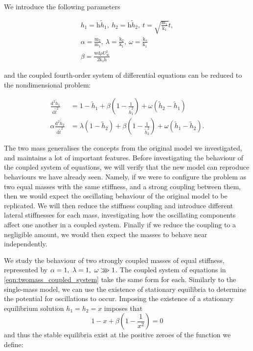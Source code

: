 \documentclass{article}
\begin{document}
We introduce the following parameters

\begin{equation*}
    \begin{aligned}
        h_1 = \mathrm{h}\tilde{h}_1,~h_2 = \mathrm{h}\tilde{h}_2,~t=\sqrt{\frac{\mathrm{m}_1}{\mathrm{k}_1}}\tilde{t}, \\
        \alpha = \frac{\mathrm{m}_2}{\mathrm{m}_1},~\lambda = \frac{\mathrm{k}_2}{\mathrm{k}_1},~\omega = \frac{\mathrm{k}_s}{\mathrm{k}_1} \\
        \beta = \frac{\mathrm{wd}\rho U_\infty^2}{2\mathrm{k}_1\mathrm{h}}
    \end{aligned}
\end{equation*}

and the coupled fourth-order system of differential equations can be reduced to the nondimensional problem:

\begin{equation}
    \begin{aligned}
        \frac{\mathrm{d}^2 \tilde{h}_1}{\mathrm{d}\tilde{t}^2} &= 1 - \tilde{h}_1 + \beta \left( 1 - \frac{1}{\tilde{h}_1^2} \right) + \omega(\tilde{h}_2-\tilde{h}_1) \\
        \alpha\frac{\mathrm{d}^2 \tilde{h}_2}{\mathrm{d}\tilde{t}^2} &= \lambda(1 - \tilde{h}_2) + \beta \left( 1 - \frac{1}{\tilde{h}_2^2} \right) + \omega(\tilde{h}_1-\tilde{h}_2).
    \end{aligned}
    \label{eqn:twomass_coupled_system}
\end{equation}

The two mass generalises the concepts from the original model we investigated,
and maintains a lot of important features.
Before investigating the behaviour of the coupled system of equations,
we will verify that the new model can reproduce behaviours we have already seen.
Namely, if we were to configure the problem as two equal masses with the same stiffness,
and a strong coupling between them,
then we would expect the oscillating behaviour of the original model to be replicated.
We will then reduce the stiffness coupling and introduce different lateral stiffnesses for each mass,
investigating how the oscillating components affect one another in a coupled system.
Finally if we reduce the coupling to a negligible amount,
we would then expect the masses to behave near independently.

We study the behaviour of two strongly coupled masses of equal stiffness, represented by \( \alpha = 1,~\lambda = 1,~\omega \gggtr 1\).
The coupled system of equations in \ref{eqn:twomass_coupled_system} take the same form for each.
Similarly to the single-mass model, we can use the existence of stationary equilibria to determine the potential for oscillations to occur.
Imposing the existence of a stationary equilibrium solution \(h_1 = h_2 = x\) imposes that
\begin{equation}
    1 - x + \beta\left(
        1 - \frac{1}{x^2}
    \right) = 0
\end{equation}
and thus the stable equilibria exist at the positive zeroes of the function we define:
\end{document}
